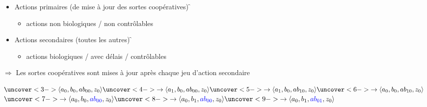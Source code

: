 \begin{frame}[t]
\begin{itemize}
  \item Actions primaires (de mise à jour des sortes coopératives)
    \f {}
    \begin{itemize}
      \item[] actions non biologiques / non contrôlables
    \end{itemize}
  \item Actions secondaires (toutes les autres)
    \f {}
    \begin{itemize}
      \item[] actions biologiques / avec délais / contrôlables
    \end{itemize}
\end{itemize}
\pause
$\Rightarrow$ Les sortes coopératives sont mises à jour après chaque jeu d'action secondaire


\medskip
$ \uncover<3->{\PHstate{a_0, b_0, ab_{00}, z_0}}
  \uncover<4->{\rightarrow\PHstate{a_1, b_0, ab_{00}, z_0}}
  \uncover<5->{\rightarrow\PHstate{a_1, b_0, ab_{10}, z_0}}
  \uncover<6->{\rightarrow\PHstate{a_0, b_0, ab_{10}, z_0}}$
\\ \qquad
$ \uncover<7->{\rightarrow\PHstate{a_0, b_0, \ex{ab_{00}}, z_0}}
  \uncover<8->{\rightarrow\PHstate{a_0, b_1, \ex{ab_{00}}, z_0}}
  \uncover<9->{\rightarrow\PHstate{a_0, b_1, \ex{ab_{01}}, z_0}}$
\end{frame}
